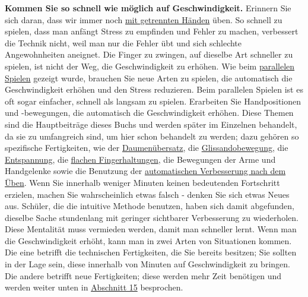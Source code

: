 \textbf{Kommen Sie so schnell wie möglich auf Geschwindigkeit.} Erinnern Sie sich daran, dass wir immer noch \hyperlink{c1ii7}{mit getrennten Händen} üben.
So schnell zu spielen, dass man anfängt Stress zu empfinden und Fehler zu machen, verbessert die Technik nicht, weil man nur die Fehler übt und sich schlechte Angewohnheiten aneignet.
Die Finger zu zwingen, auf dieselbe Art schneller zu spielen, ist nicht der Weg, die Geschwindigkeit zu erhöhen.
Wie beim \hyperlink{c1ii11}{parallelen Spielen} gezeigt wurde, brauchen Sie neue Arten zu spielen, die automatisch die Geschwindigkeit erhöhen und den Stress reduzieren.
Beim parallelen Spielen ist es oft sogar einfacher, schnell als langsam zu spielen.
Erarbeiten Sie Handpositionen und -bewegungen, die automatisch die Geschwindigkeit erhöhen.
Diese Themen sind die Hauptbeiträge dieses Buchs und werden später im Einzelnen behandelt, da sie zu umfangreich sind, um hier schon behandelt zu werden; dazu gehören so spezifische Fertigkeiten, wie der \hyperlink{c1iii5b}{Daumenübersatz}, die \hyperlink{c1iii5c}{Glissandobewegung}, die \hyperlink{c1ii14}{Entspannung}, die \hyperlink{c1iii4b}{flachen Fingerhaltungen}, die Bewegungen der Arme und Handgelenke sowie die Benutzung der \hyperlink{c1ii15}{automatischen Verbesserung nach dem Üben}.
Wenn Sie innerhalb weniger Minuten keinen bedeutenden Fortschritt erzielen, machen Sie wahrscheinlich etwas falsch - denken Sie sich etwas Neues aus.
Schüler, die die intuitive Methode benutzen, haben sich damit abgefunden, dieselbe Sache stundenlang mit geringer sichtbarer Verbesserung zu wiederholen.
Diese Mentalität muss vermieden werden, damit man schneller lernt.
Wenn man die Geschwindigkeit erhöht, kann man in zwei Arten von Situationen kommen.
Die eine betrifft die technischen Fertigkeiten, die Sie bereits besitzen; Sie sollten in der Lage sein, diese innerhalb von Minuten auf Geschwindigkeit zu bringen.
Die andere betrifft neue Fertigkeiten; diese werden mehr Zeit benötigen und werden weiter unten in \hyperlink{c1ii15}{Abschnitt 15} besprochen.

